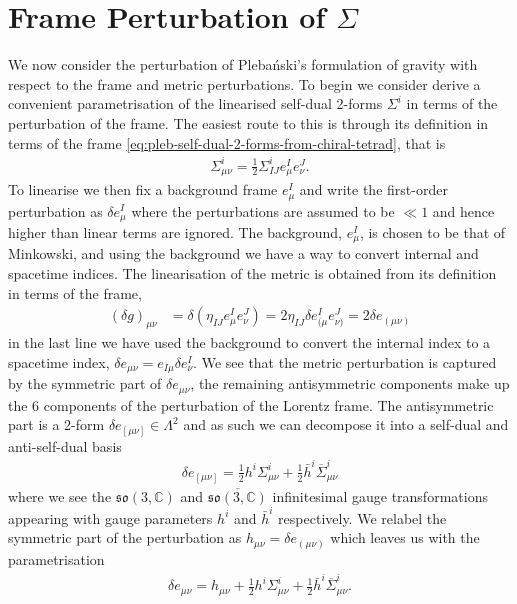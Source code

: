 \documentclass[10pt]{report}
\newcommand{\pleb}[0]{Pleba\'nski}
\theoremstyle{definition}
\newcommand{\C}[0]{\mathbb{C}}
\newcommand{\asd}[0]{\overline{\Sigma}}
\begin{document}
\section{Frame Perturbation of \texorpdfstring{$\Sigma$}{Σ}}
We now consider the perturbation of \pleb{}'s formulation of gravity with respect to the frame and metric perturbations. To begin we consider derive a convenient parametrisation of the linearised self-dual 2-forms $\Sigma^i$ in terms of the perturbation of the frame. The easiest route to this is through its definition in terms of the frame \cref{eq:pleb-self-dual-2-forms-from-chiral-tetrad}, that is 
\begin{align}
    \Sigma^i_{\mu\nu} = \frac{1}{2} \Sigma^i_{IJ} e^I_\mu e^J_\nu.
\end{align}
To linearise we then fix a background frame $e^I_\mu$ and write the first-order perturbation as $\delta e^I_\mu$ where the perturbations are assumed to be $\ll 1$ and hence higher than linear terms are ignored. The background, $e^I_\mu$, is chosen to be that of Minkowski, and using the background we have a way to convert internal and spacetime indices. The linearisation of the metric is obtained from its definition in terms of the frame,
\begin{align}
    {(\delta g)}_{\mu\nu} & = \delta( \eta_{IJ} e^I_\mu e^J_\nu ) = 2 \eta_{IJ} \delta e^I_{(\mu} e^J_{\nu)} = 2 \delta e_{(\mu\nu)}
\end{align}
in the last line we have used the background to convert the internal index to a spacetime index, $\delta e_{\mu\nu} = e_{I\mu} \delta e^I_\nu$. We see that the metric perturbation is captured by the symmetric part of $\delta e_{\mu\nu}$, the remaining antisymmetric components make up the $6$ components of the perturbation of the Lorentz frame. The antisymmetric part is a 2-form $\delta e_{[\mu\nu]} \in \Lambda^2$ and as such we can decompose it into a self-dual and anti-self-dual basis
\begin{align}
    \delta e_{[\mu\nu]} = \frac{1}{2} h^i \Sigma^i_{\mu\nu} + \frac{1}{2} \bar{h}^i \asd^i_{\mu\nu}
\end{align}
where we see the $\mathfrak{so}(3,\C)$ and $\overline{\mathfrak{so}(3,\C)}$ infinitesimal gauge transformations appearing with gauge parameters $h^i$ and $\bar{h}^i$ respectively. We relabel the symmetric part of the perturbation as $h_{\mu\nu} = \delta e_{(\mu\nu)}$ which leaves us with the parametrisation 
\begin{align}
    \delta e_{\mu\nu} = h_{\mu\nu} + \frac{1}{2} h^i \Sigma^i_{\mu\nu} + \frac{1}{2} \bar{h}^i \asd^i_{\mu\nu}. \label{eq:lin-so13-frame-perturbation-parametrisation}
\end{align} 
\end{document}
